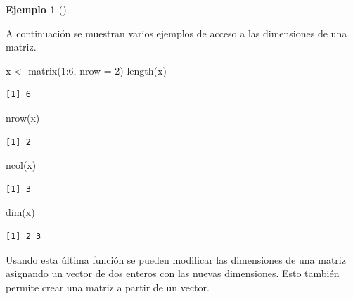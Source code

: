 \documentclass[
  a4paper,
]{scrreport}
\newenvironment{Shaded}{\begin{snugshade}}{\end{snugshade}}
\newcommand{\AttributeTok}[1]{\textcolor[rgb]{0.40,0.45,0.13}{#1}}
\newcommand{\DecValTok}[1]{\textcolor[rgb]{0.68,0.00,0.00}{#1}}
\newcommand{\FunctionTok}[1]{\textcolor[rgb]{0.28,0.35,0.67}{#1}}
\newcommand{\NormalTok}[1]{\textcolor[rgb]{0.00,0.23,0.31}{#1}}
\newcommand{\OtherTok}[1]{\textcolor[rgb]{0.00,0.23,0.31}{#1}}
\newcommand{\SpecialCharTok}[1]{\textcolor[rgb]{0.37,0.37,0.37}{#1}}
\theoremstyle{definition}
\newtheorem{example}{Ejemplo}[chapter]
\theoremstyle{definition}
\theoremstyle{remark}
\begin{document}
\leavevmode{}%
\begin{example}[]\label{exm-dimensiones-matriz}

A continuación se muestran varios ejemplos de acceso a las dimensiones
de una matriz.

\begin{Shaded}
\begin{Highlighting}[]
\NormalTok{x }\OtherTok{\textless{}{-}} \FunctionTok{matrix}\NormalTok{(}\DecValTok{1}\SpecialCharTok{:}\DecValTok{6}\NormalTok{, }\AttributeTok{nrow =} \DecValTok{2}\NormalTok{)}
\FunctionTok{length}\NormalTok{(x)}
\end{Highlighting}
\end{Shaded}

\begin{verbatim}
[1] 6
\end{verbatim}

\begin{Shaded}
\begin{Highlighting}[]
\FunctionTok{nrow}\NormalTok{(x)}
\end{Highlighting}
\end{Shaded}

\begin{verbatim}
[1] 2
\end{verbatim}

\begin{Shaded}
\begin{Highlighting}[]
\FunctionTok{ncol}\NormalTok{(x)}
\end{Highlighting}
\end{Shaded}

\begin{verbatim}
[1] 3
\end{verbatim}

\begin{Shaded}
\begin{Highlighting}[]
\FunctionTok{dim}\NormalTok{(x)}
\end{Highlighting}
\end{Shaded}

\begin{verbatim}
[1] 2 3
\end{verbatim}

\end{example}

Usando esta última función se pueden modificar las dimensiones de una
matriz asignando un vector de dos enteros con las nuevas dimensiones.
Esto también permite crear una matriz a partir de un vector.
\end{document}
